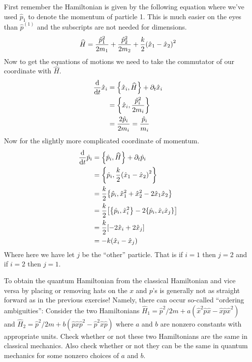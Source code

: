 \documentclass[boxes,pages]{homework}
\makeatletter
\numberwithin{@problem}{section}
\makeatother
\begin{document}
\begin{solution}
	First remember the Hamiltonian is given by the following equation where we've used $\hat{p}_1$ to denote the momentum of particle 1. This is much easier on the eyes than $\hat{p}^{(1)}$ and the subscripts are not needed for dimensions.
	\begin{equation*}
		\widehat{H} = \frac{\hat{p}_1^2}{2m_1} + \frac{\hat{p}_2^2}{2m_2} + \frac{k}{2}\qty(\hat{x}_1 - \hat{x}_2)^2
	\end{equation*}
	Now to get the equations of motions we need to take the commutator of our coordinate with $\widehat{H}$.
	\begin{align*}
		\dv{t}\hat{x}_i & = \pb{\hat{x}_i}{\widehat{H}} + \partial_t \hat{x}_i \\
		                & = \pb{\hat{x}_i}{\frac{\hat{p}_i^2}{2m_i}}           \\
		                & = \frac{2\hat{p}_i}{2m_i} = \frac{\hat{p}_i}{m_i}
	\end{align*}
	Now for the slightly more complicated coordinate of momentum.
	\begin{align*}
		\dv{t}\hat{p}_i & = \pb{\hat{p}_i}{\widehat{H}} + \partial_t \hat{p}_i                                 \\
		                & = \pb{\hat{p}_i}{\frac{k}{2}\qty(\hat{x}_1 - \hat{x}_2)^2}                           \\
		                & = \frac{k}{2}\pb{\hat{p}_i}{\hat{x}_1^2 + \hat{x}_2^2 - 2\hat{x}_1\hat{x}_2}         \\
		                & = \frac{k}{2}\qty[\pb{\hat{p}_i}{\hat{x}_i^2} - 2\pb{\hat{p}_i}{\hat{x}_i\hat{x}_j}] \\
		                & = \frac{k}{2}\qty[-2\hat{x}_i + 2\hat{x}_j]                                          \\
		                & = -k\qty(\hat{x}_i - \hat{x}_j)
	\end{align*}
	Where here we have let $j$ be the ``other'' particle. That is if $i = 1$ then $j = 2$ and if $i = 2$ then $j = 1$.
\end{solution}

\begin{problem}
To obtain the quantum Hamiltonian from the classical Hamiltonian and vice versa by placing or removing hats on the $x$ and $p$’s is generally not as straight forward as in the previous exercise! Namely, there can occur so-called ``ordering ambiguities'': Consider the two Hamiltonians $\hat{H}_1 = \hat{p}^2/2m + a(\hat{x}^2\hat{p}\hat{x} - \hat{x}\hat{p}\hat{x}^2)$
and
$\hat{H}_2 = \hat{p}^2/2m + b(\hat{p}\hat{x}\hat{p}^2 - \hat{p}^2\hat{x}\hat{p})$ where $a$ and $b$ are nonzero constants with appropriate units. Check whether or not these two Hamiltonians are the same in classical mechanics. Also check whether or not they can be the same in quantum mechanics for some nonzero choices of $a$ and $b$.
\end{problem}
\end{document}
